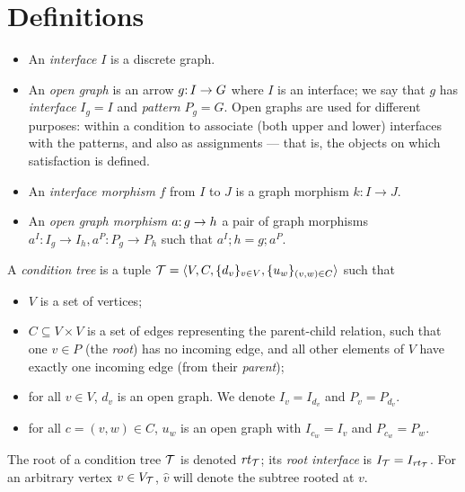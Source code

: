 \section{Definitions}
\label{sec:definitions}

\begin{itemize}
\item An \emph{interface} $I$ is a discrete graph.

\item An \emph{open graph} is an arrow $g{:}\, I\rightarrow G$ where $I$ is an interface; we say that $g$ has \emph{interface} $I_g=I$ and \emph{pattern} $P_g=G$. Open graphs are used for different purposes: within a condition to associate (both upper and lower) interfaces with the patterns, and also as assignments --- that is, the objects on which satisfaction is defined.

\item An \emph{interface morphism} $f$ from $I$ to $J$ is a graph morphism $k:I\to J$.

\item An \emph{open graph morphism} $a{:}\, g\rightarrow h$ a pair of graph morphisms $a^I:I_g\to I_h, a^P:P_g\to P_h$ such that $a^I;h=g;a^P$.
\end{itemize}
%
\begin{definition}\label{def:condition tree}
A \emph{condition tree} is a tuple ${\mathcal{T}}=\langle V, C, \{{d_v}\}_{v\in V}, \{{u_w}\}_{(v,w)\in C}\rangle$ such that

\begin{itemize}[topsep=\smallskipamount]
\item $V$ is a set of vertices;

\item $C\subseteq V\times V$ is a set of edges representing the parent-child relation, such that one $v\in P$ (the \emph{root}) has no incoming edge, and all other elements of $V$ have exactly one incoming edge (from their \emph{parent});

\item for all $v\in V$, $d_v$ is an open graph. We denote $I_v=I_{d_v}$ and $P_v=P_{d_v}$.

\item for all $c=(v,w)\in C$, $u_w$ is an open graph with $I_{c_w}=I_v$ and $P_{c_w}=P_w$. 
\end{itemize}
\end{definition}
%
The root of a condition tree ${\mathcal{T}}$ is denoted $\mathit{rt}_{{\mathcal{T}}}$; its \emph{root interface} is $I_{\mathcal{T}}=I_{\mathit{rt}_{{\mathcal{T}}}}$. For an arbitrary vertex $v\in V_{\mathcal{T}}$, $\hat v$ will denote the subtree rooted at $v$.

